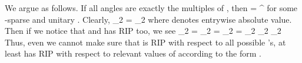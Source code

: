 We argue as follows.
If all angles  are exactly the multiples of , then
 {
\NC {}
=\NC {}    ^\Adj \NR
}
for some -sparse  and unitary .
Clearly,
 {
\NC {} _2
\NC = _2 \NR
}
where  denotes entrywise absolute value.
Then if we notice that  and  has  RIP too, we see
 {
\NC \NC {} _2 \NR
%
\NC =\NC {} _2 \NR
%
\NC =\NC {} _2 \NR
%
\NC =\NC {} _2 \D
    _2 \NR
%
\NC \eqsim \NC {} _2  \NR
}
Thus, even we cannot make sure that  is  RIP with respect to all possible 's, at least  has RIP with respect to relevant values of  according to the form .

\stopsubsection

\stopsection
